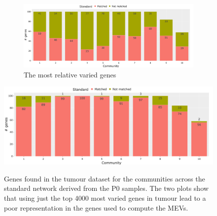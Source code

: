 \begin{figure}[H]
    \centering
    \begin{subfigure}[b]{1.0\textwidth}
        \includegraphics[width=\textwidth,keepaspectratio]{Sections/Network_I/Resources/P0/4K_p0_modConMev_rep_standard_4K_50TF_v3.png}
        \caption{The most relative varied genes}
        \label{fig:ap:std_p0_mev_sel_rep}
    \end{subfigure}
    \includegraphics[width=\textwidth,keepaspectratio]{Sections/Network_I/Resources/P0/13K_p0_modConMev_rep_standard_4K_50TF_v3.png}
    \label{fig:ap:std_p0_mev_all_rep}
    \caption[Gene representation in tumour dataset]{Genes found in the tumour dataset for the communities across the standard network derived from the P0 samples. The two plots show that using just the top 4000 most varied genes in tumour lead to a poor representation in the genes used to compute the MEVs.}
    \label{fig:ap:std_p0_mev_rep}
\end{figure}
